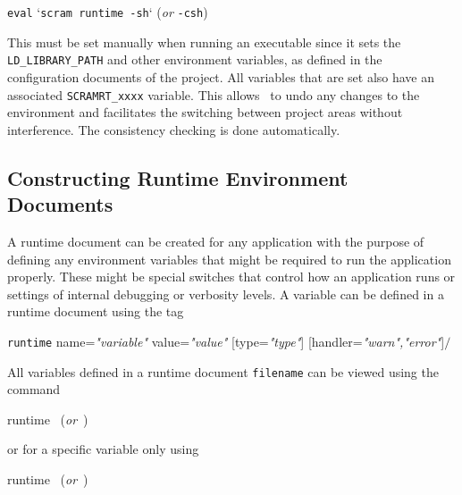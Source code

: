 \begin{tagprint}
  \texttt{eval} `\texttt{scram runtime}~\texttt{-sh}` (\textit{or} \texttt{-csh})
\end{tagprint}

\ni This must be set manually when running an executable since it
sets the \texttt{LD\_LIBRARY\_PATH} and other environment
variables, as defined in the configuration documents of the
project.  All variables that are set also have an associated
\texttt{SCRAMRT\_xxxx} variable. This allows \scram\ to undo any
changes to the environment and facilitates the switching between
project areas without interference. The consistency checking is done
automatically.

\subsection{Constructing Runtime Environment Documents}\label{sec:constructingruntimedocs}
A runtime document can be created for any application with the purpose
of defining any environment variables that might be required to run
the application properly. These might be special switches that control
how an application runs or settings of internal debugging or verbosity
levels. A variable can be defined in a runtime document using the tag

\begin{tagprint}
\lbkt\texttt{runtime} name=\textit{"variable"} value=\textit{"value"}
{[}type=\textit{"type"}{]} {[}handler=\textit{"warn","error"}{]}$/$\rbkt\mbox{}\\
\end{tagprint}

\ni All variables defined in a runtime document \texttt{filename} can be viewed using the command

\begin{scramcmd}{runtime}
  ~(\textit{or}~)~
\end{scramcmd}

\ni or for a specific variable only using

\begin{scramcmd}{runtime}
 ~(\textit{or}~)~~
\end{scramcmd}

